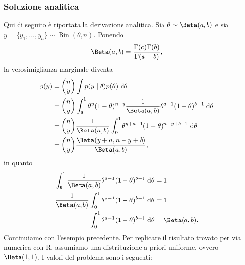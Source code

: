 \documentclass[
  10pt,
  italian,
  a4paper,
  extrafontsizes,onecolumn,openright
  ]{memoir}
\newenvironment{Shaded}{\begin{snugshade}}{\end{snugshade}}
\newcommand{\AttributeTok}[1]{\textcolor[rgb]{0.77,0.63,0.00}{#1}}
\newcommand{\CommentTok}[1]{\textcolor[rgb]{0.56,0.35,0.01}{\textit{#1}}}
\newcommand{\ControlFlowTok}[1]{\textcolor[rgb]{0.13,0.29,0.53}{\textbf{#1}}}
\newcommand{\DecValTok}[1]{\textcolor[rgb]{0.00,0.00,0.81}{#1}}
\newcommand{\FunctionTok}[1]{\textcolor[rgb]{0.00,0.00,0.00}{#1}}
\newcommand{\NormalTok}[1]{#1}
\newcommand{\OtherTok}[1]{\textcolor[rgb]{0.56,0.35,0.01}{#1}}
\newcommand{\SpecialCharTok}[1]{\textcolor[rgb]{0.00,0.00,0.00}{#1}}
\DeclareMathOperator{\Bin}{Bin} %
\newcommand{\R}{\textsf{R}} %
\begin{document}
\begin{Shaded}
\end{Shaded}

\hypertarget{soluzione-analitica}{%
\subsubsection{Soluzione analitica}\label{soluzione-analitica}}

Qui di seguito è riportata la derivazione analitica. Sia \(\theta \sim \Beta(a, b)\) e sia \(y = \{y_1, \dots, y_n\} \sim \Bin(\theta, n)\). Ponendo
\[
\Beta(a, b) = \frac{\Gamma(a)\Gamma(b)}{\Gamma(a+b)},
\]
\noindent
la verosimiglianza marginale diventa
\begin{align}
p(y) &= \binom{n}{y} \int p(y \mid \theta) p(\theta) \,\operatorname {d}\!\theta \notag\\
&= \binom{n}{y}\int_0^1 \theta^{y} (1 - \theta)^{n- y} \frac{1}{\Beta(a,b)} \theta^{a-1} (1-\theta)^{b-1} \,\operatorname {d}\!\theta \notag\\
&= \binom{n}{y}\frac{1}{\Beta(a,b)} \int_0^1 \theta^{y + a - 1} (1-\theta)^{n- y + b-1}  \,\operatorname {d}\!\theta \notag\\
&= \binom{n}{y}\frac{\Beta(y + a, n- y + b)}{\Beta(a,b)},
\end{align}
\noindent
in quanto
\begin{align}
\int_0^1 \frac{1}{\Beta(a,b)} \theta^{a-1} (1-\theta)^{b-1} \,\operatorname {d}\! \theta &= 1\notag\\
\frac{1}{\Beta(a,b)} \int_0^1  \theta^{a-1} (1-\theta)^{b-1} \,\operatorname {d}\! \theta &= 1\notag\\
\int_0^1  \theta^{a-1} (1-\theta)^{b-1} \,\operatorname {d}\!\theta &= \Beta(a,b). \notag
\end{align}
\noindent
Continuiamo con l'esempio precedente. Per replicare il risultato trovato per via numerica con \R, assumiamo una distribuzione a priori uniforme, ovvero \(\Beta(1, 1)\). I valori del problema sono i seguenti:
\end{document}
